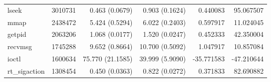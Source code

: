\begin{tabular}{>{\ttfamily}lrrrrr}
                          lseek &   3010731 &           0.463 (0.0679) &           0.903 (0.1624) &        0.440083 &    95.067507 \\
                           mmap &   2438472 &           5.424 (0.5294) &           6.022 (0.2403) &        0.597917 &    11.024045 \\
                         getpid &   2063206 &           1.068 (0.0177) &           1.520 (0.0247) &        0.452333 &    42.350004 \\
                        recvmsg &   1745288 &           9.652 (0.8664) &          10.700 (0.5092) &        1.047917 &    10.857084 \\
                          ioctl &   1600634 &         75.770 (21.1585) &          39.999 (5.9090) &      -35.771583 &   -47.210644 \\
                   rt_sigaction &   1308454 &           0.450 (0.0363) &           0.822 (0.0272) &        0.371833 &    82.690882 \\
\bottomrule
\end{tabular}
